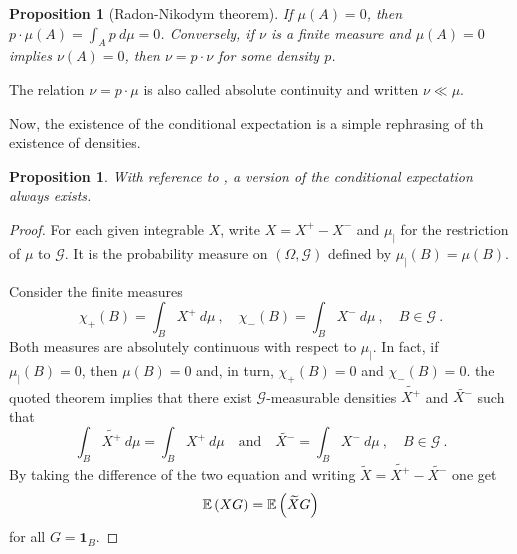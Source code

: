 \documentclass[12pt,a4paper]{amsart}
\newcommand{\one}{\bm 1}
\theoremstyle{plain}%
\newtheorem{proposition}[thm]{Proposition}
\theoremstyle{definition}
\theoremstyle{remark}
\begin{document}
\begin{proposition}[Radon-Nikodym theorem]
If $\mu(A) = 0$, then $p \cdot \mu(A) = \int_A p \ d\mu =
0$. Conversely, if $\nu$ is a finite measure and $\mu(A) = 0$ implies
$\nu(A) =0$, then $\nu = p \cdot \nu$ for some density $p$. \end{proposition}

The relation $\nu = p \cdot \mu$ is also called absolute continuity
and written $\nu \ll \mu$.

Now, the existence of the conditional expectation is a simple
rephrasing of th existence of densities.

\begin{proposition}
With reference to , a version of the conditional expectation always exists.  
\end{proposition}

\begin{proof}
For each given integrable
$X$, write $X=X^+-X^-$ and $\mu_|$ for the restriction of $\mu$ to
$\mathcal G$. It is the probability measure on $(\Omega, \mathcal
G)$  defined by $\mu_|(B) = \mu(B)$.

Consider the finite measures
\begin{equation*}
  \chi_+(B) = \int_B X^+ \ d\mu \ , \quad \chi_-(B) = \int_B X^- \
  d\mu \ , \quad B \in
  \mathcal G \ .  
\end{equation*}
Both measures are absolutely continuous with respect to $\mu_|$. In
fact, if $\mu_|(B) = 0$, then $\mu(B)=0$ and, in turn, $\chi_+(B) = 0$
and $\chi_-(B)=0$. the quoted theorem implies that there exist $\mathcal G$-measurable densities $\widetilde{X^+}$
and $\widetilde{X^-}$ such that
\begin{equation*}
  \int_B \widetilde{X^+} \ d\mu = \int_B X^+ \ d\mu \quad \text{and} \quad
  \widetilde{X^-} = \int_B X^- \ d\mu \ , \quad  B \in \mathcal G \ .  
\end{equation*}
By taking the difference of the two equation and writing
$\widetilde{X}=\widetilde{X^+}-\widetilde{X^-}$ one get
\begin{equation*}
  \operatorname{\mathbb E}\left(X G\right) = \operatorname{\mathbb E}\left(\widetilde X G\right)
\end{equation*}
for all $G = \one_B$.
\end{proof}


\end{document}
